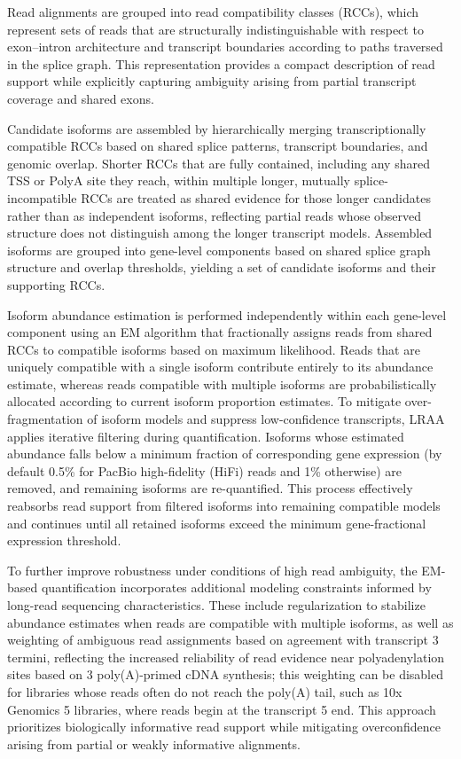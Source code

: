 Read alignments are grouped into read compatibility classes (RCCs), which represent sets of reads that are structurally indistinguishable with respect to exon--intron architecture and transcript boundaries according to paths traversed in the splice graph. This representation provides a compact description of read support while explicitly capturing ambiguity arising from partial transcript coverage and shared exons.

Candidate isoforms are assembled by hierarchically merging transcriptionally compatible RCCs based on shared splice patterns, transcript boundaries, and genomic overlap. Shorter RCCs that are fully contained, including any shared TSS or PolyA site they reach, within multiple longer, mutually splice-incompatible RCCs are treated as shared evidence for those longer candidates rather than as independent isoforms, reflecting partial reads whose observed structure does not distinguish among the longer transcript models. Assembled isoforms are grouped into gene-level components based on shared splice graph structure and overlap thresholds, yielding a set of candidate isoforms and their supporting RCCs.

Isoform abundance estimation is performed independently within each gene-level component using an EM algorithm that fractionally assigns reads from shared RCCs to compatible isoforms based on maximum likelihood. Reads that are uniquely compatible with a single isoform contribute entirely to its abundance estimate, whereas reads compatible with multiple isoforms are probabilistically allocated according to current isoform proportion estimates. To mitigate over-fragmentation of isoform models and suppress low-confidence transcripts, LRAA applies iterative filtering during quantification. Isoforms whose estimated abundance falls below a minimum fraction of corresponding gene expression (by default 0.5\% for PacBio high-fidelity (HiFi) reads and 1\% otherwise) are removed, and remaining isoforms are re-quantified. This process effectively reabsorbs read support from filtered isoforms into remaining compatible models and continues until all retained isoforms exceed the minimum gene-fractional expression threshold.

To further improve robustness under conditions of high read ambiguity, the EM-based quantification incorporates additional modeling constraints informed by long-read sequencing characteristics. These include regularization to stabilize abundance estimates when reads are compatible with multiple isoforms, as well as weighting of ambiguous read assignments based on agreement with transcript 3\p{} termini, reflecting the increased reliability of read evidence near polyadenylation sites based on 3\p{} poly(A)-primed cDNA synthesis; this weighting can be disabled for libraries whose reads often do not reach the poly(A) tail, such as 10x Genomics 5\p{} libraries, where reads begin at the transcript 5\p{} end. This approach prioritizes biologically informative read support while mitigating overconfidence arising from partial or weakly informative alignments.

